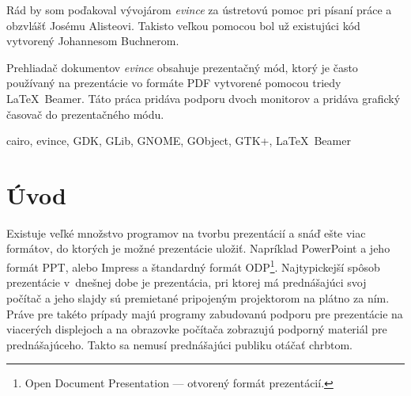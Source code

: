 \documentclass[12pt,oneside,final]{fithesis2}
\begin{document}
\FrontMatter
\ThesisTitlePage




\begin{ThesisDeclaration}
\DeclarationText
\AdvisorName
\end{ThesisDeclaration}

\begin{ThesisThanks}
Rád by som poďakoval vývojárom \emph{evince} za ústretovú pomoc pri písaní práce a obzvlášť Josému Alisteovi. Takisto veľkou pomocou bol už existujúci kód vytvorený Johannesom Buchnerom.
\end{ThesisThanks} 

\begin{ThesisAbstract}
Prehliadač dokumentov \emph{evince} obsahuje prezentačný mód, ktorý je často používaný na prezentácie vo formáte PDF vytvorené pomocou triedy \LaTeX~Beamer. Táto práca pridáva podporu dvoch monitorov a pridáva grafický časovač do prezentačného módu.
\end{ThesisAbstract}

\begin{ThesisKeyWords}
cairo, evince, GDK, GLib, GNOME, GObject, GTK+, \LaTeX~Beamer
\end{ThesisKeyWords}
 
\MainMatter
\setcounter{tocdepth}{3}
\tableofcontents 
 
\chapter{Úvod}

Existuje veľké množstvo programov na tvorbu prezentácií a snáď ešte viac formátov, do ktorých je možné prezentácie uložiť. Napríklad PowerPoint a jeho formát PPT, alebo Impress a štandardný formát ODP\footnote{Open Document Presentation --- otvorený formát prezentácií.}. Najtypickejší spôsob prezentácie v~dnešnej dobe je prezentácia, pri ktorej má prednášajúci svoj počítač a jeho slajdy sú premietané pripojeným projektorom na plátno za ním. Práve pre takéto prípady majú programy zabudovanú podporu pre prezentácie na viacerých displejoch a na obrazovke počítača zobrazujú podporný materiál pre prednášajúceho. Takto sa nemusí prednášajúci publiku otáčať chrbtom.
\end{document}
